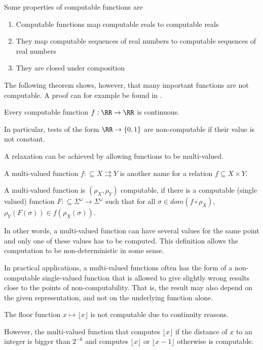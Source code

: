 Some  properties of computable functions are
\begin{enumerate}
  \item Computable functions map computable reals to computable reals
  \item They map computable sequences of real numbers to computable
    sequences of real numbers
  \item They are closed under composition
\end{enumerate}

The following theorem shows, however, that many important functions are not computable. 
A proof can for example be found in \cite{Wei}.
\begin{theorem}
  Every computable function $f: \RR \to \RR$ is continuous.
\end{theorem}

In particular, tests of the form $\RR \to \{0,1\}$ are non-computable if their
value is not constant. 

A relaxation can be achieved by allowing functions to be multi-valued.
\begin{definition}
A multi-valued function $f: \subseteq X \rightrightarrows Y$ is another name for a relation $f \subseteq X \times Y$.

A multi-valued function is $(\rho_X, \rho_Y)$ computable, if there is a
computable (single valued) function 
$F: \subseteq \Sigma^\omega \to \Sigma^\omega$ such that for all $\sigma \in dom(f \circ \rho_X)$, $\rho_Y(F(\sigma)) \in f(\rho_X(\sigma))$. 
\end{definition}
In other words, a multi-valued function can have several values for the same point and only one
of these values has to be computed. 
This definition allows the computation to be non-deterministic in some sense.

In practical applications, a multi-valued functions often
has the form of a non-computable single-valued function that is allowed to
give slightly wrong results close to the points of non-computability.
That is, the result may also depend on the given representation, and not on the
underlying function alone.
\begin{example}
  The floor function $x \mapsto \lfloor x \rfloor$ is not computable due to
  continuity reasons.
  
  However, the multi-valued function that computes $\lfloor x \rfloor$ if the
  distance of $x$ to an integer is bigger than $2^{-k}$ and computes $\lfloor x
  \rfloor$ or $\lfloor x-1 \rfloor$ otherwise is computable.
\end{example}

